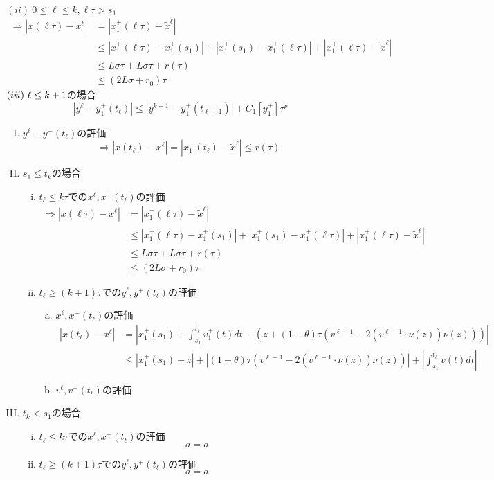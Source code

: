 \documentclass[a4,12pt]{article}
\begin{document}
$(ii)\ 0\le\ell\le k,\ell\tau>s_1$
\[\begin{split}
    \Rightarrow|x(\ell\tau)-x^\ell|&=|x^{+}_1(\ell\tau)-\tilde{x}^\ell|\\
                        &\le|x^{+}_1(\ell\tau)-x^{+}_1(s_1)|+|x^{+}_1(s_1)-x^{+}_1(\ell\tau)|+|x^{+}_1(\ell\tau)-\tilde{x}^\ell|\\
                        &\le L\sigma\tau+L\sigma\tau+r(\tau)\\
                        &\le (2L\sigma+r_0)\tau
\end{split}\]
$\\(iii)\ \ell\le k+1$の場合
\[|y^\ell - y^{+}_1(t_\ell)|\le|y^{k+1}-y^+_1(t_{\ell+1})|+C_1[y^+_1]\tau^p\]
\newpage
\begin{enumerate}[(I).]
    \item$y^\ell-y^{-}(t_\ell)$の評価
    \[\Rightarrow|x(t_\ell)-x^\ell|=|x^{-}_1(t_\ell)-\tilde{x}^\ell|\le r(\tau)\]
    \item$s_1\le t_k$の場合
    \begin{enumerate}[(i).]
        \item$t_\ell\le k\tau$での$x^\ell,x^+(t_\ell)$の評価
        \begin{align*}
            \Rightarrow|x(\ell\tau)-x^\ell|&=|x^{+}_1(\ell\tau)-\tilde{x}^\ell|\\
                                &\le|x^{+}_1(\ell\tau)-x^{+}_1(s_1)|+|x^{+}_1(s_1)-x^{+}_1(\ell\tau)|+|x^{+}_1(\ell\tau)-\tilde{x}^\ell|\\
                                &\le L\sigma\tau+L\sigma\tau+r(\tau)\\
                                &\le (2L\sigma+r_0)\tau
            \end{align*}
        \item$t_\ell\ge (k+1)\tau$での$y^\ell,y^+(t_\ell)$の評価
        \begin{enumerate}[(a).]
            \item $x^\ell,x^+(t_\ell)$の評価
            \begin{align*}
            |x(t_\ell)-x^\ell|&=|x^+_1(s_1)+\int^{t_\ell}_{s_1}v^+_1(t)dt-(z+(1-\theta)\tau(v^{\ell-1}-2(v^{\ell-1}\cdot\nu(z))\nu(z)))|\\
                          &\leq |x^+_1(s_1)-z|+|(1-\theta)\tau(v^{\ell-1}-2(v^{\ell-1}\cdot\nu(z))\nu(z))|+|\int^{t_\ell}_{s_1}v(t)dt|
            \end{align*}
            \item $v^\ell,v^+(t_\ell)$の評価
        \end{enumerate}
    \end{enumerate}
    \item$t_k<s_1$の場合
    \begin{enumerate}[(i).]
        \item $t_\ell\le k\tau$での$x^\ell,x^+(t_\ell)$の評価\[a=a\]
        \item $t_\ell\ge (k+1)\tau$での$y^\ell,y^+(t_\ell)$の評価\[a=a\]
    \end{enumerate}
\end{enumerate}
\end{document}
